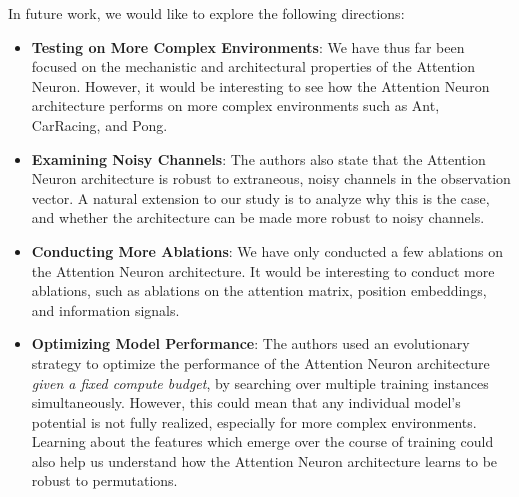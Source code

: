 \documentclass{article}
\begin{document}
In future work, we would like to explore the following directions:
\begin{itemize}
    \item \textbf{Testing on More Complex Environments}:
        We have thus far been focused on the mechanistic and architectural properties of the Attention Neuron.
        However, it would be interesting to see how the Attention Neuron architecture performs
        on more complex environments such as Ant, CarRacing, and Pong.
    \item \textbf{Examining Noisy Channels}:
        The authors \cite{Tang-and-Ha-2021} also state that the Attention Neuron architecture
        is robust to extraneous, noisy channels in the observation vector.
        A natural extension to our study is to analyze why this is the case, and whether the architecture
        can be made more robust to noisy channels.
    \item \textbf{Conducting More Ablations}:
        We have only conducted a few ablations on the Attention Neuron architecture.
        It would be interesting to conduct more ablations, such as ablations on the attention matrix,
        position embeddings, and information signals.
    \item \textbf{Optimizing Model Performance}:
        The authors \cite{Tang-and-Ha-2021} used an evolutionary strategy to 
        optimize the performance of the Attention Neuron architecture \textit{given a fixed compute budget},
        by searching over multiple training instances simultaneously.
        However, this could mean that any individual model's potential is not fully realized,
        especially for more complex environments.
        Learning about the features which emerge over the course of training
        could also help us understand how the Attention Neuron architecture learns to be robust to permutations.

\end{itemize}



\end{document}

